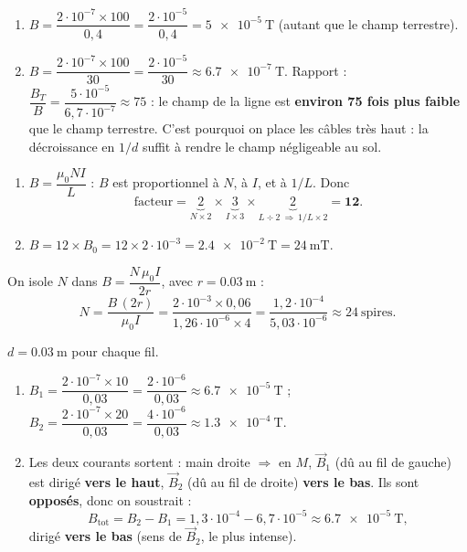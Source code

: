 \documentclass[11pt,a4paper]{article}
\newcommand{\vv}[1]{\vec{#1}}\newcommand{\ds}{\displaystyle}
\begin{document}
\begin{corrige}
\begin{enumerate}[label=\alph*)]
  \item $B=\dfrac{2\cdot10^{-7}\times100}{0{,}4}=\dfrac{2\cdot10^{-5}}{0{,}4}=\qty{5e-5}{\tesla}$
        (autant que le champ terrestre).
  \item $B=\dfrac{2\cdot10^{-7}\times100}{30}=\dfrac{2\cdot10^{-5}}{30}\approx\qty{6.7e-7}{\tesla}$.
        Rapport : $\dfrac{B_T}{B}=\dfrac{5\cdot10^{-5}}{6{,}7\cdot10^{-7}}\approx 75$ : le champ de la
        ligne est \textbf{environ 75 fois plus faible} que le champ terrestre. C'est pourquoi on place
        les câbles très haut : la décroissance en $1/d$ suffit à rendre le champ négligeable au sol.
\end{enumerate}
\end{corrige}

\begin{corrige}
\begin{enumerate}[label=\alph*)]
  \item $B=\dfrac{\mu_0 N I}{L}$ : $B$ est proportionnel à $N$, à $I$, et à $1/L$. Donc
        \[ \text{facteur}= \underbrace{2}_{N\times2}\times\underbrace{3}_{I\times3}\times
           \underbrace{2}_{L\div2\ \Rightarrow\ 1/L\times2}=\mathbf{12}. \]
  \item $B=12\times B_0=12\times2\cdot10^{-3}=\qty{2.4e-2}{\tesla}=\qty{24}{\milli\tesla}.$
\end{enumerate}
\end{corrige}

\begin{corrige}
On isole $N$ dans $B=\dfrac{N\,\mu_0 I}{2r}$, avec $r=\qty{0.03}{\metre}$ :
\[ N=\frac{B\,(2r)}{\mu_0 I}=\frac{2\cdot10^{-3}\times0{,}06}{1{,}26\cdot10^{-6}\times4}
    =\frac{1{,}2\cdot10^{-4}}{5{,}03\cdot10^{-6}}\approx 24\ \text{spires}. \]
\end{corrige}

\begin{corrige}
$d=\qty{0.03}{\metre}$ pour chaque fil.
\begin{enumerate}[label=\alph*)]
  \item $B_1=\dfrac{2\cdot10^{-7}\times10}{0{,}03}=\dfrac{2\cdot10^{-6}}{0{,}03}\approx\qty{6.7e-5}{\tesla}$ ;
        \quad $B_2=\dfrac{2\cdot10^{-7}\times20}{0{,}03}=\dfrac{4\cdot10^{-6}}{0{,}03}\approx\qty{1.3e-4}{\tesla}$.
  \item Les deux courants sortent : main droite $\Rightarrow$ en $M$, $\vv{B}_1$ (dû au fil de gauche)
        est dirigé \textbf{vers le haut}, $\vv{B}_2$ (dû au fil de droite) \textbf{vers le bas}. Ils
        sont \textbf{opposés}, donc on soustrait :
        \[ B_{\text{tot}}=B_2-B_1=1{,}3\cdot10^{-4}-6{,}7\cdot10^{-5}\approx\qty{6.7e-5}{\tesla}, \]
        dirigé \textbf{vers le bas} (sens de $\vv{B}_2$, le plus intense).
\end{enumerate}
\end{corrige}
\end{document}
